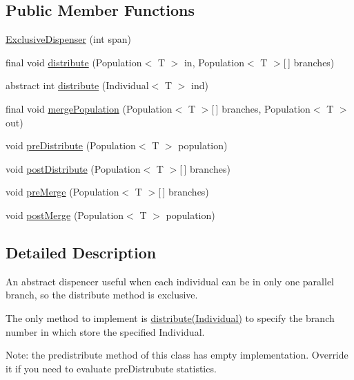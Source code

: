 \subsection*{Public Member Functions}
\begin{DoxyCompactItemize}
\item 
\hyperlink{classjenes_1_1stage_1_1_exclusive_dispenser_3_01_t_01extends_01_chromosome_01_4_af8fba035b8567ce8d509fbc7601b4c75}{Exclusive\-Dispenser} (int span)
\item 
final void \hyperlink{classjenes_1_1stage_1_1_exclusive_dispenser_3_01_t_01extends_01_chromosome_01_4_a7ecda0fa0e34e3a31ab2d06cd2b6d593}{distribute} (Population$<$ T $>$ in, Population$<$ T $>$\mbox{[}$\,$\mbox{]} branches)
\item 
abstract int \hyperlink{classjenes_1_1stage_1_1_exclusive_dispenser_3_01_t_01extends_01_chromosome_01_4_a706558b075a61b04099decf44729c870}{distribute} (Individual$<$ T $>$ ind)
\item 
final void \hyperlink{classjenes_1_1stage_1_1_exclusive_dispenser_3_01_t_01extends_01_chromosome_01_4_a1179e92bbe9a4942b9097d9846c01801}{merge\-Population} (Population$<$ T $>$\mbox{[}$\,$\mbox{]} branches, Population$<$ T $>$ out)
\item 
void \hyperlink{classjenes_1_1stage_1_1_exclusive_dispenser_3_01_t_01extends_01_chromosome_01_4_ad5db6c2748cabd6055a33421f601dba4}{pre\-Distribute} (Population$<$ T $>$ population)
\item 
void \hyperlink{classjenes_1_1stage_1_1_exclusive_dispenser_3_01_t_01extends_01_chromosome_01_4_a70031ab873b045876e716d0e702d7846}{post\-Distribute} (Population$<$ T $>$\mbox{[}$\,$\mbox{]} branches)
\item 
void \hyperlink{classjenes_1_1stage_1_1_exclusive_dispenser_3_01_t_01extends_01_chromosome_01_4_ae93239ca47669daaeea41d2f8ab6fe51}{pre\-Merge} (Population$<$ T $>$\mbox{[}$\,$\mbox{]} branches)
\item 
void \hyperlink{classjenes_1_1stage_1_1_exclusive_dispenser_3_01_t_01extends_01_chromosome_01_4_a67b4ecbb23bc9860e1985a2a573b8823}{post\-Merge} (Population$<$ T $>$ population)
\end{DoxyCompactItemize}


\subsection{Detailed Description}
An abstract dispencer useful when each individual can be in only one parallel branch, so the distribute method is exclusive.\par
 The only method to implement is \hyperlink{}{distribute(\-Individual)} to specify the branch number in which store the specified Individual.\par
 \par
 Note\-: the predistribute method of this class has empty implementation. Override it if you need to evaluate pre\-Distrubute statistics.


